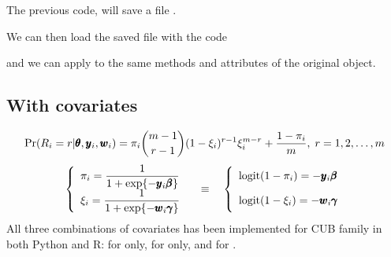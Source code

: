 \documentclass[letterpaper,10pt,english]{sphinxmanual}
\begin{document}
\sphinxAtStartPar
The previous code, will save a file .

\sphinxAtStartPar
We can then load the saved file with the code
\def\sphinxLiteralBlockLabel{\label{\detokenize{manual:id45}}}
\begin{sphinxVerbatim}[commandchars=\\\{\},numbers=left,firstnumber=1,stepnumber=1]
   

  
\end{sphinxVerbatim}

\sphinxAtStartPar
and we can apply to  the same methods and attributes of the original  object.


\subsection{With covariates}
\label{\detokenize{manual:with-covariates}}\label{\detokenize{manual:cub-with-covariates}}
\sphinxAtStartPar
{}

\sphinxAtStartPar
{}

\sphinxAtStartPar
{}
\begin{equation*}
\begin{split}\Pr(R_i=r|\pmb\theta, \pmb y_i, \pmb w_i) = \pi_i \dbinom{m-1}{r-1}(1-\xi_i)^{r-1}\xi_i^{m-r}+\dfrac{1-\pi_i}{m}
,\; r = 1,2,\ldots,m\end{split}
\end{equation*}\begin{equation*}
\begin{split}\left\{
\begin{array}{l}
    \pi_i = \dfrac{1}{1+\exp\{-\pmb y_i \pmb \beta\}}
    \\
    \xi_i = \dfrac{1}{1+\exp\{-\pmb w_i \pmb \gamma\}}
\end{array}
\right.
\quad \equiv \quad
\left\{
\begin{array}{l}
    \mathrm{logit}(1-\pi_i) = - \pmb y_i \pmb \beta
    \vphantom{\dfrac{1}{1+\exp\{-\pmb y_i \pmb \beta\}}}
    \\
    \mathrm{logit}(1-\xi_i) = - \pmb w_i \pmb \gamma
    \vphantom{\dfrac{1}{1+\exp\{-\pmb w_i \pmb \gamma\}}}
\end{array}
\right.\end{split}
\end{equation*}
\sphinxAtStartPar
All three combinations of covariates has been implemented for CUB family in both Python and R:
for  only, for  only, and for .
\end{document}
